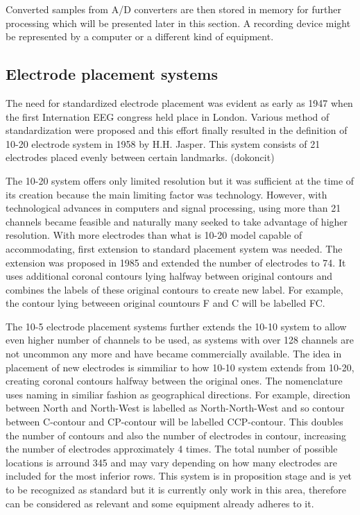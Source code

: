 Converted samples from A/D converters are then stored in memory for further
processing which will be presented later in this section. A recording device
might be represented by a computer or a different kind of equipment.

\subsection{Electrode placement systems}
The need for standardized electrode placement was evident as early as 1947 when
the first Internation EEG congress held place in London. Various method of
standardization were proposed and this effort finally resulted in the definition
of 10-20 electrode system in 1958 by H.H. Jasper. \cite{elSys} 
This system consists of 21 electrodes placed evenly between certain landmarks.
(dokoncit)

The 10-20 system offers only limited resolution but it was sufficient at the
time of its creation because the main limiting factor was technology. However,
with technological advances in computers and signal processing, using more than
21 channels became feasible and naturally many seeked to take advantage of
higher resolution. With more electrodes than what is 10-20 model capable of
accommodating, first extension to standard placement system was needed. The
extension was proposed in 1985 and extended the number of electrodes to 74. It
uses additional coronal contours lying halfway between original contours and
combines the labels of these original contours to create new label.
For example, the contour lying betweeen original countours F and C will be
labelled FC. \cite{elSys}

The 10-5 electrode placement systems further extends the 10-10 system to allow
even higher number of channels to be used, as systems with over 128 channels are
not uncommon any more and have became commercially available. The idea in
placement of new electrodes is simmiliar to how 10-10 system extends from
10-20, creating coronal contours halfway between the original ones. The
nomenclature uses naming in similiar fashion as geographical directions. For
example, direction between North and North-West is labelled as North-North-West
and so contour between C-contour and CP-contour will be labelled CCP-contour.
This doubles the number of contours and also the number of electrodes in
contour, increasing the number of electrodes approximately 4 times. The total
number of possible locations is arround 345 and may vary depending on how many
electrodes are included for the most inferior rows. \cite{elSys} This system is
in proposition stage and is yet to be recognized as standard but it is currently
only work in this area, therefore can be considered as relevant and some
equipment already adheres to it.

